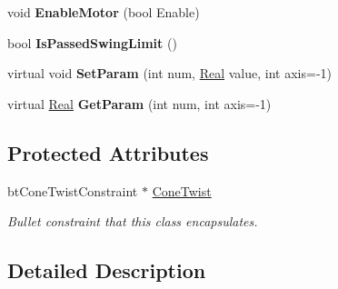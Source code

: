 \begin{DoxyCompactItemize}
\item 
\hypertarget{classphys_1_1ConeTwistConstraint_aaf0447bbeeca85fa10959072491cafaf}{
void {\bfseries EnableMotor} (bool Enable)}
\label{da/dbc/classphys_1_1ConeTwistConstraint_aaf0447bbeeca85fa10959072491cafaf}

\item 
\hypertarget{classphys_1_1ConeTwistConstraint_ab7306ac08c3fd61cf88567b4e70702c0}{
bool {\bfseries IsPassedSwingLimit} ()}
\label{da/dbc/classphys_1_1ConeTwistConstraint_ab7306ac08c3fd61cf88567b4e70702c0}

\item 
\hypertarget{classphys_1_1ConeTwistConstraint_a555fc33b10a0c156e0ac93b94587098a}{
virtual void {\bfseries SetParam} (int num, \hyperlink{namespacephys_af7eb897198d265b8e868f45240230d5f}{Real} value, int axis=-\/1)}
\label{da/dbc/classphys_1_1ConeTwistConstraint_a555fc33b10a0c156e0ac93b94587098a}

\item 
\hypertarget{classphys_1_1ConeTwistConstraint_aab54f6c56622cef4314d3bbff194421e}{
virtual \hyperlink{namespacephys_af7eb897198d265b8e868f45240230d5f}{Real} {\bfseries GetParam} (int num, int axis=-\/1)}
\label{da/dbc/classphys_1_1ConeTwistConstraint_aab54f6c56622cef4314d3bbff194421e}

\end{DoxyCompactItemize}
\subsection*{Protected Attributes}
\begin{DoxyCompactItemize}
\item 
\hypertarget{classphys_1_1ConeTwistConstraint_a6bb25f6554b09cc9ce3afb7e1c46f074}{
btConeTwistConstraint $\ast$ \hyperlink{classphys_1_1ConeTwistConstraint_a6bb25f6554b09cc9ce3afb7e1c46f074}{ConeTwist}}
\label{da/dbc/classphys_1_1ConeTwistConstraint_a6bb25f6554b09cc9ce3afb7e1c46f074}

\begin{DoxyCompactList}\small\item\em Bullet constraint that this class encapsulates. \item\end{DoxyCompactList}\end{DoxyCompactItemize}


\subsection{Detailed Description}


